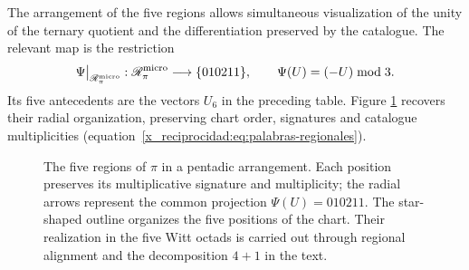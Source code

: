 The arrangement of the five regions allows simultaneous visualization
of the unity of the ternary quotient and the differentiation preserved by the
catalogue. The relevant map is the restriction
\[
 \Psi\big|_{\mathscr R_\pi^{\rm micro}}:
 \mathscr R_\pi^{\rm micro}\longrightarrow\{010211\},
 \qquad \Psi(U)=(-U)\bmod3.
\]
Its five antecedents are the vectors \(U_6\) in the preceding table.
Figure \ref{x_reciprocidad:pi-estrella:figura} recovers their radial organization,
preserving chart order, signatures and catalogue
multiplicities (equation~\eqref{x_reciprocidad:eq:palabras-regionales}).


\begin{figure}[H]
\centering
{}
\caption{The five regions of \(\pi\) in a pentadic arrangement.
Each position preserves its multiplicative signature and multiplicity;
the radial arrows represent the common projection
\(\Psi(U)=010211\). The star-shaped outline organizes the five
positions of the chart. Their realization in the five Witt octads
is carried out through regional alignment and the decomposition
\(4+1\) in the text.}
\label{x_reciprocidad:pi-estrella:figura}
\end{figure}

